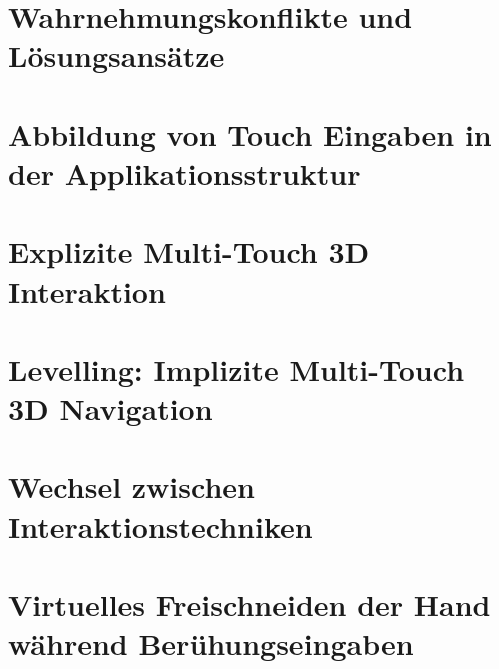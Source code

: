 \documentclass[pdftex,12pt,a4paper]{report}
\begin{document}

\chapter{Wahrnehmungskonflikte und Lösungsansätze}
\label{chp:wahrnehmungskonflikte_und_loesungsansaetze}



\chapter{Abbildung von Touch Eingaben in der Applikationsstruktur}
\label{chp:applikationsstruktur}



\chapter{Explizite Multi-Touch 3D Interaktion}
\label{chp:explizite_interaktion}



\chapter{Levelling: Implizite Multi-Touch 3D Navigation}
\label{chp:implizite_navigation}



\chapter{Wechsel zwischen Interaktionstechniken}
\label{chp:wechsel_zwischen_interaktionstechniken}



\chapter{Virtuelles Freischneiden der Hand während Berühungseingaben}
\label{chp:freischneiden}


\end{document}

